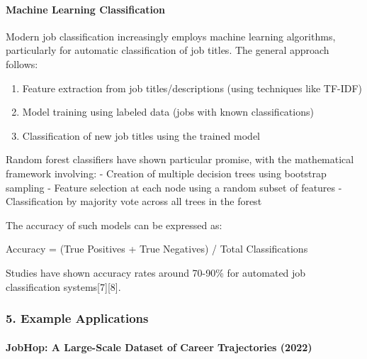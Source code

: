 \documentclass[./main.tex]{subfiles}
\begin{document}
\paragraph{Machine Learning
Classification}\label{machine-learning-classification}

Modern job classification increasingly employs machine learning
algorithms, particularly for automatic classification of job titles. The
general approach follows:

\begin{enumerate}
\def\labelenumi{\arabic{enumi}.}
\tightlist
\item
  Feature extraction from job titles/descriptions (using techniques like
  TF-IDF)
\item
  Model training using labeled data (jobs with known classifications)
\item
  Classification of new job titles using the trained model
\end{enumerate}

Random forest classifiers have shown particular promise, with the
mathematical framework involving: - Creation of multiple decision trees
using bootstrap sampling - Feature selection at each node using a random
subset of features - Classification by majority vote across all trees in
the forest

The accuracy of such models can be expressed as:

Accuracy = (True Positives + True Negatives) / Total Classifications

Studies have shown accuracy rates around 70-90\% for automated job
classification systems{[}7{]}{[}8{]}.

\subsubsection{5. Example Applications}\label{example-applications}

\paragraph{JobHop: A Large-Scale Dataset of Career Trajectories
(2022)}\label{jobhop-a-large-scale-dataset-of-career-trajectories-2022}
\end{document}
